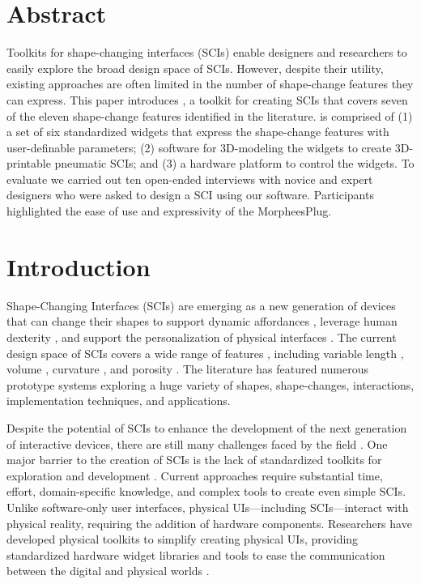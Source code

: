   \section{Abstract}
    Toolkits for shape-changing interfaces (SCIs) enable designers and researchers
    to easily explore the broad design space of SCIs. However, despite their
    utility, existing approaches are often limited in the number of shape-change
    features they can express. This paper introduces \mp, a toolkit for creating
    SCIs that covers seven of the eleven shape-change features identified in the
    literature. \mp is comprised of (1) a set of six standardized widgets that
    express the shape-change features with user-definable parameters; (2) software
    for 3D-modeling the widgets to create 3D-printable pneumatic SCIs; and (3) a
    hardware platform to control the widgets. To evaluate \mp we carried out ten
    open-ended interviews with novice and expert designers who were asked to
    design a SCI using our software. Participants highlighted the ease of use and
    expressivity of the MorpheesPlug.

  \section{Introduction}
    Shape-Changing Interfaces (SCIs) are emerging as a new generation of
    devices that can change their shapes to support dynamic affordances
    \cite{Follmer:2013}, leverage human dexterity \cite{6926382},
    and support the personalization of physical interfaces
    \cite{Kim:2008}. The current design space of SCIs covers a
    wide range of features \cite{10.1145/3173574.3174193}, including variable
    length \cite{Follmer:2013}, volume
    \cite{Kim:2008}, curvature \cite{Yao:2013}, and porosity
    \cite{Coelho:2009}. The literature has featured numerous prototype systems
    exploring a huge variety of shapes, shape-changes, interactions,
    implementation techniques, and applications. 
    
    Despite the potential of SCIs to enhance the development of the
    next generation of interactive devices, there are still many challenges
    faced by the field \cite{Alexander:2018}. One major barrier to the creation
    of SCIs is the lack of standardized toolkits for exploration and development
    \cite{Alexander:2018}. Current approaches require substantial time,
    effort, domain-specific knowledge, and complex tools to create even simple
    SCIs. Unlike software-only user interfaces, physical UIs---including
    SCIs---interact with physical reality, requiring the addition of hardware
    components.  Researchers have developed physical toolkits to simplify
    creating physical UIs, providing standardized hardware widget libraries
    \cite{Greenberg:2001,Bdeir:2009kz} and tools to ease the communication
    between the digital and physical worlds \cite{Hartmann:2007}.
    
